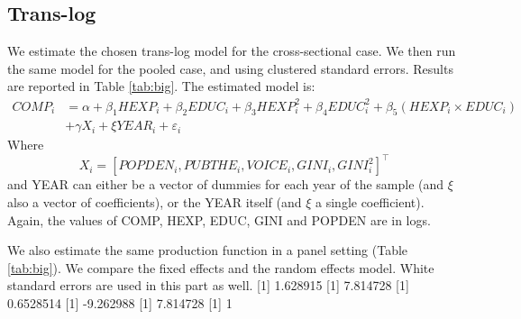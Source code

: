 \documentclass[12pt,a4paper]{article}\usepackage[]{graphicx}\usepackage[]{color}
\begin{document}
\subsection{Trans-log}
We estimate the chosen trans-log model for the cross-sectional case. We then run the same model for the pooled case, and using clustered standard errors. Results are reported in Table \ref{tab:big}. The estimated model is:
\begin{equation}
\begin{aligned}
COMP_i &= \alpha + \beta_1 HEXP_i + \beta_2 EDUC_i + \beta_3 HEXP_i^2 + \beta_4 EDUC_i^2 + \beta_5 \left(HEXP_i \times EDUC_i\right) \\ &+ \gamma X_i + \xi YEAR_i + \varepsilon_i
\end{aligned}
\end{equation}
Where $$ X_i = \left[ POPDEN_i, PUBTHE_i, VOICE_i, GINI_i, GINI_i^2 \right]^\top$$ and YEAR can either be a vector of dummies for each year of the sample (and $\xi$ also a vector of coefficients), or the YEAR itself (and $\xi$ a single coefficient). Again, the values of COMP, HEXP, EDUC, GINI and POPDEN are in logs.


We also estimate the same production function in a panel setting (Table \ref{tab:big}). We compare the fixed effects and the random effects model. White standard errors are used in this part as well.
[1] 1.628915
[1] 7.814728
[1] 0.6528514
[1] -9.262988
[1] 7.814728
[1] 1
\end{document}

